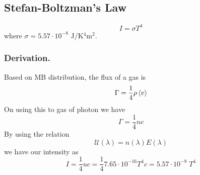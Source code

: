 \documentclass[../../../Main.tex]{subfiles}
\begin{document}
\subsection*{Stefan-Boltzman's Law}
\begin{equation*}
    I=\sigma T^4
\end{equation*}
where $\sigma=5.57\cdot10^{-8}$ J/K$^{4}$m$^{2}$.

\subsubsection*{Derivation.} Based on MB distribution, the flux of a gas is 
\begin{equation*}
    \Gamma=\frac{1}{4}\rho\braket{v}
\end{equation*}
On using this to gas of photon we have 
\begin{equation*}
    \Gamma=\frac{1}{4}nc
\end{equation*} 
By using the relation 
\begin{equation*}
    \mathcal{U}(\lambda)=n(\lambda)E(\lambda)
\end{equation*}
we have our intensity as 
\begin{equation*}
    I=\frac{1}{4}uc=\frac{1}{4}7.65\cdot10^{-16} T^4c=5.57\cdot10^{-8}\; T^4
\end{equation*}
\end{document}

